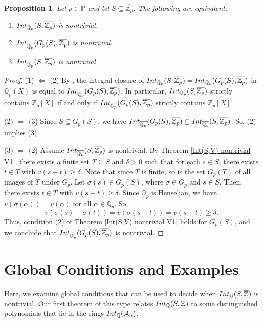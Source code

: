 \documentclass{article}
\newtheorem{Prop}[equation]{Proposition}
\theoremstyle{definition}\newtheorem{Def}[equation]{Definition}
\theoremstyle{definition}\newtheorem{Ques}[equation]{Question}
\theoremstyle{definition}\newtheorem{Conj}[equation]{Conjecture}
\theoremstyle{definition}\newtheorem{Not}[equation]{Notation}
\newcommand{\Q}{\mathbb{Q}}
\newcommand{\oQ}{\overline{\Q}}
\newcommand{\oZ}{\overline{\Z}}
\newcommand{\Z}{\mathbb{Z}}
\newcommand{\oZp}{\overline{\Z_p}}
\newcommand{\oQp}{\overline{\Q_p}}
\newcommand{\Int}{\textnormal{Int}}
\newcommand{\IntQ}{\Int_{\Q}}
\newcommand{\An}{\mathcal{A}_n}
\newcommand{\PP}{\mathbb{P}}
\numberwithin{equation}{section}
\begin{document}
\begin{Prop}\label{nontriviality Galois conjugate}
Let $p \in \PP$ and let $S\subseteq\oZp$. The following are equivalent.
\begin{enumerate}[(1)]
\item $\Int_{\Q_p}(S,\oZp)$ is nontrivial.%
\item $\Int_{\oQp}(G_p(S),\oZp)$ is nontrivial.%
\item $\Int_{\oQp}(S,\oZp)$ is nontrivial.%
\end{enumerate}
\end{Prop}
\begin{proof}
(1) $\Leftrightarrow$ (2) By \cite[Lemma 2.20]{PerDedekind}, the integral closure of $\Int_{\Q_p}(S,\oZp)=\Int_{\Q_p}(G_p(S),\oZp)$ in $\oQp(X)$ is equal to $\Int_{\oQp}(G_p(S),\oZp)$. In particular, $\Int_{\Q_p}(S,\oZp)$ strictly contains $\Z_p[X]$ if and only if $\Int_{\oQp}(G_p(S),\oZp)$  strictly contains $\oZp[X]$. 

(2) $\Rightarrow$ (3) Since $S\subseteq G_p(S)$, we have $\Int_{\oQp}(G_p(S),\oZp) \subseteq \Int_{\oQp}(S,\oZp)$. So, (2) implies (3).

(3) $\Rightarrow$ (2) Assume $\Int_{\oQp}(S,\oZp)$ is nontrivial. By Theorem \ref{Int(S,V) nontrivial V1}, there exists a finite set $T \subseteq S$ and $\delta > 0$ such that for each $s \in S$, there exists $t \in T$ with $v(s-t) \geq \delta$. Note that since $T$ is finite, so is the set $G_p(T)$ of all images of $T$ under $G_p$. Let $\sigma(s) \in G_p(S)$, where $\sigma \in G_p$ and $s \in S$. Then, there exists $t \in T$ with $v(s-t) \geq \delta$. Since $\oQ_p$ is Henselian, we have $v(\sigma(\alpha)) = v(\alpha)$ for all $\alpha \in \oQ_p$. So,
\begin{equation*}
v(\sigma(s) - \sigma(t)) = v(\sigma(s-t)) = v(s-t) \geq \delta.
\end{equation*}
Thus, condition (2) of Theorem \ref{Int(S,V) nontrivial V1} holds for $G_p(S)$, and we conclude that $\Int_{\oQ_p}(G_p(S),\oZp)$ is nontrivial.
\end{proof}


\section{Global Conditions and Examples}\label{Global section}

Here, we examine global conditions that can be used to decide when $\IntQ(S,\oZ)$ is nontrivial. Our first theorem of this type relates $\IntQ(S,\oZ)$ to some distinguished polynomials that lie in the rings $\IntQ(\An)$.
\end{document}
